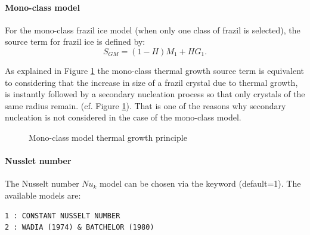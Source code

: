 \paragraph{Mono-class model}

For the mono-class frazil ice model (when only one class of frazil is selected),
 the source term for frazil ice is defined by:
\begin{equation}
S_{GM} = (1-H)M_{1} + HG_{1}.
\label{eq:model:sgm:monoclass}
\end{equation}

As explained in Figure \ref{fig:sgm_monoclass} the mono-class thermal growth source term
is equivalent to considering that the increase in size of a frazil crystal due to thermal growth,
is instantly followed by a secondary nucleation process so that only crystals of the same radius remain.
(cf. Figure \ref{fig:sgm_monoclass}). That is one of the reasons why secondary nucleation is not
considered in the case of the mono-class model.

\begin{figure}[H]
    \begin{center}
    \end{center}
    \caption{Mono-class model thermal growth principle}
    \label{fig:sgm_monoclass}
\end{figure}


\paragraph{Nusslet number}
\label{paragraph:nusselt}
The Nusselt number $Nu_k$ model can be chosen via the keyword  (default=1).
The available models are:
\begin{lstlisting}
1 : CONSTANT NUSSELT NUMBER
2 : WADIA (1974) & BATCHELOR (1980)
\end{lstlisting}

